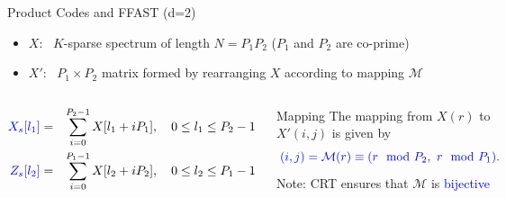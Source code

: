 \documentclass[10pt,xcolor=table]{beamer}
\begin{document}
	\begin{frame}{Product Codes and FFAST (d=2)}
	
	\begin{itemize}
		\item \alert{$X$}: \ $K$-sparse spectrum of length $N = P_1 P_2$  ($P_1$ and $P_2$ are co-prime)
		\item \alert{$X'$}: \  $P_1 \times P_2$ matrix formed by rearranging $X$ according to mapping $\mathcal{M}$	
	\end{itemize}
	
	\begin{columns}
		
		\begin{block}{}
			\scriptsize{
				\begin{eqnarray}\nonumber
				{\color{blue}X_s[l_1]} & = & \sum_{i=0}^{P_2-1} X[l_1+iP_1], \ \ \ 0 \leq l_1 \leq P_2-1  \label{eqn:Xs_equation} \\ \nonumber
				{\color{blue}Z_s[l_2]} & = & \sum_{i=0}^{P_1-1} X[l_2+iP_2], \ \ \  0 \leq l_2 \leq P_1-1  \label{eqn:Zs} \nonumber
				\end{eqnarray} }	
		\end{block}
		
		\begin{block}{Mapping}
	The mapping from $X(r)$ to $X'(i,j)$ is given by
	\[\color{blue}
	(i,j) = \mathcal{M}(r) \equiv (r \mod P_2, \ r \mod P_1).
	\]
	\alert{Note:} CRT ensures that $\mathcal{M}$ is \textcolor{blue}{bijective}
	    \end{block}
	
	
	
	\begin{figure}[t]
		\centering
		\includegraphics[width=1.8in]{./Figures/ProductCodesMatrix}	
	\end{figure}
	
	\end{columns}
	\end{frame}
\end{document}
